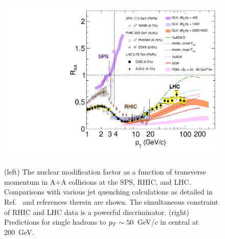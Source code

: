\begin{figure}[!hbt]
 \begin{center}
   \includegraphics[width=0.43\linewidth]{figs/raa_compiled_QM11_square_hi2011}
   \caption[ The nuclear modification factor \raa vs transverse
   momentum at the SPS, RHIC, and LHC, compared to various jet
   quenching calculations]{(left) The nuclear modification factor \raa
     as a function of transverse momentum in A$+$A collisions at the
     SPS, RHIC, and LHC.  Comparisons with various jet quenching
     calculations as detailed in Ref.~\cite{CMS:2012aa} and references
     therein are shown.  The simultaneous constraint of RHIC and LHC
     data is a powerful discriminator. (right) Predictions for single
     hadrons \raa to $\mbox{${p_T}$}\sim50$~GeV/$c$ in central \auau at 200~GeV.}
  \label{fig:virtualityevolution_singlehadron}
  \label{fig:cmsqhat}
 \end{center}
\end{figure}


